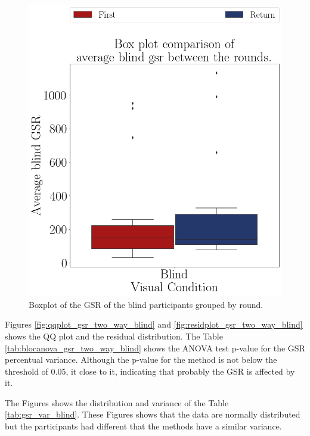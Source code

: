 \begin{figure}[!htb]
\begin{minipage}{0.45\textwidth}
        \includegraphics[width = 0.8\linewidth]{Resultados/GSR/Figuras/png/boxplot_gsr_avg_blind_rounds.png}
        \caption{Boxplot of the GSR of the blind participants grouped by round.}
        \label{fig:boxplot_gsr_avg_blind_rounds}
    \end{minipage}
\end{figure}

Figures \ref{fig:qqplot_gsr_two_way_blind} and \ref{fig:residplot_gsr_two_way_blind} shows the QQ plot and the residual distribution. The Table \ref{tab:blocanova_gsr_two_way_blind} shows the ANOVA test p-value for the GSR percentual variance. Although the p-value for the method is not below the threshold of 0.05, it close to it, indicating that probably the GSR is affected by it. 

The Figures  shows the distribution and variance of the Table \ref{tab:gsr_var_blind}. These Figures shows that the data are normally distributed but the participants had different  that the methods have a similar variance.

